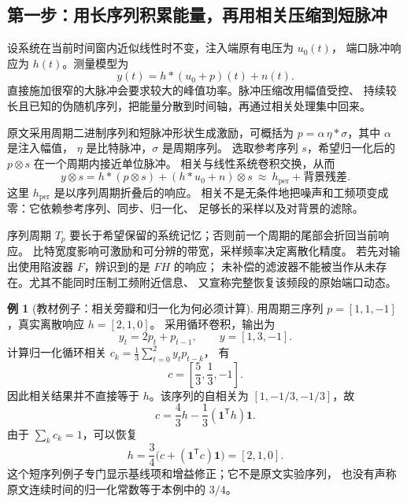 \documentclass[UTF8,11pt,fontset=fandol,openany,oneside]{ctexbook}
\theoremstyle{definition}
\newtheorem{example}[theorem]{例}
\theoremstyle{remark}
\numberwithin{equation}{chapter}
\begin{document}
\subsection{第一步：用长序列积累能量，再用相关压缩到短脉冲}
设系统在当前时间窗内近似线性时不变，注入端原有电压为 $u_0(t)$，
端口脉冲响应为 $h(t)$。测量模型为
\[
 y(t)=h*(u_0+p)(t)+n(t).
\]
直接施加很窄的大脉冲会要求较大的峰值功率。脉冲压缩改用幅值受控、
持续较长且已知的伪随机序列，把能量分散到时间轴，再通过相关处理集中回来。

原文采用周期二进制序列和短脉冲形状生成激励，可概括为
$p=\alpha\,\eta*\sigma$，其中 $\alpha$ 是注入幅值，
$\eta$ 是比特脉冲，$\sigma$ 是周期序列。
选取参考序列 $s$，希望归一化后的 $p\otimes s$ 在一个周期内接近单位脉冲。
相关与线性系统卷积交换，从而
\begin{equation}\label{eq:tb-P5-correlation}
 y\otimes s
 =h*(p\otimes s)+(h*u_0+n)\otimes s
 \ \approx\ h_{\mathrm{per}}+\text{背景残差}.
\end{equation}
这里 $h_{\mathrm{per}}$ 是以序列周期折叠后的响应。
相关不是无条件地把噪声和工频项变成零：它依赖参考序列、同步、归一化、
足够长的采样以及对背景的滤除。

序列周期 $T_p$ 要长于希望保留的系统记忆；否则前一个周期的尾部会折回当前响应。
比特宽度影响可激励和可分辨的带宽，采样频率决定离散化精度。
若先对输出使用陷波器 $F$，辨识到的是 $FH$ 的响应；
未补偿的滤波器不能被当作从未存在。尤其不能同时压制工频附近信息、
又宣称完整恢复该频段的原始端口动态。

\begin{example}[教材例子：相关旁瓣和归一化为何必须计算]
用周期三序列 $p=[1,1,-1]$，真实离散响应 $h=[2,1,0]$。
采用循环卷积，输出为
\[
 y_t=2p_t+p_{t-1},\qquad y=[1,3,-1].
\]
计算归一化循环相关 $c_k=\frac13\sum_{t=0}^{2}y_t p_{t-k}$，
有
\[
 c=\left[\frac53,\frac13,-1\right].
\]
因此相关结果并不直接等于 $h$。该序列的自相关为
$[1,-1/3,-1/3]$，故
\[
 c=\frac43h-\frac13(\mathbf1^\mathsf Th)\mathbf1.
\]
由于 $\sum_k c_k=1$，可以恢复
\[
 h=\frac34\bigl(c+(\mathbf1^\mathsf Tc)\mathbf1\bigr)=[2,1,0].
\]
这个短序列例子专门显示基线项和增益修正；它不是原文实验序列，
也没有声称原文连续时间的归一化常数等于本例中的 $3/4$。
\end{example}
\end{document}
